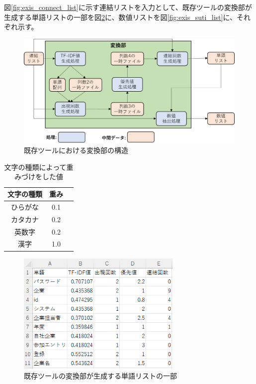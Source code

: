 図\ref{fig:exis_connect_list}に示す連結リストを入力として、既存ツールの変換部が生成する単語リストの一部を図\ref{fig:exis_word_list}に、数値リストを図\ref{fig:exis_suti_list}に、それぞれ示す。

\begin{figure}[p]
    \begin{center}
        \includegraphics[width=1.0\columnwidth]{image/exis_transfer_structure.png}
        \caption{既存ツールにおける変換部の構造}
        \label{fig:exis_transfer_structure}
    \end{center}
\end{figure}

\begin{table}[p]
    \begin{center}      
        \caption{文字の種類によって重みづけをした値}\label{table:yusenti}
        \begin{tabular}{c|c|c}
        文字の種類  & 重み \\ \hline \hline
        ひらがな & 0.1 \\ \hline
        カタカナ	 & 0.2\\ \hline
        英数字  & 0.2\\ \hline
        漢字 & 1.0\\ \hline
        \end{tabular}
    \end{center}
\end{table}

\begin{figure}[tp]
    \begin{center}
        \includegraphics[width=300]{image/exis_word_list.png}
        \caption{既存ツールの変換部が生成する単語リストの一部}
        \label{fig:exis_word_list}
    \end{center}
\end{figure}

